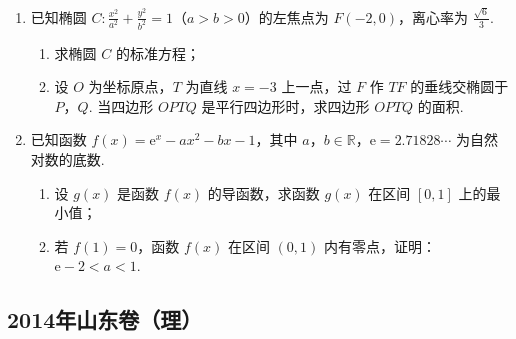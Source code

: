 \begin{description}
\begin{enumerate}[leftmargin=5pt]
\begin{enumerate}
\item 证明：数列 \(\{b_{n}\}\) 为等比数列；
\item 若 \(a_{1} = 1\)，函数 \(f(x)\) 的图象在点 \((a_{2}, b_{2})\) 处的切线在 \(x\) 轴上的截距为 \(2 - \frac{1}{\ln 2}\)，求数列 \(\{a_{n} b_{n}^{2}\}\) 的前 \(n\) 项和 \(S_{n}\).
\end{enumerate}

        \item 已知椭圆 \(C: \frac{x^2}{a^2} + \frac{y^2}{b^2} = 1\)（\(a > b > 0\)）的左焦点为 \(F(-2,0)\)，离心率为 \(\frac{\sqrt{6}}{3}\).

\begin{enumerate}
\item 求椭圆 \(C\) 的标准方程；
\item 设 \(O\) 为坐标原点，\(T\) 为直线 \(x = -3\) 上一点，过 \(F\) 作 \(TF\) 的垂线交椭圆于 \(P\)，\(Q\). 当四边形 \(OPTQ\) 是平行四边形时，求四边形 \(OPTQ\) 的面积.
\end{enumerate}

        \item 已知函数 \(f(x) = {\mathrm{e}}^{x} - ax^{2} - bx - 1\)，其中 \(a\)，\(b \in \mathbb{R}\)，\({\mathrm{e}} = 2.71828\cdots\) 为自然对数的底数.

\begin{enumerate}
\item 设 \(g(x)\) 是函数 \(f(x)\) 的导函数，求函数 \(g(x)\) 在区间 \([0,1]\) 上的最小值；
\item 若 \(f(1)=0\)，函数 \(f(x)\) 在区间 \((0,1)\) 内有零点，证明：\({\mathrm{e}} - 2 < a < 1\).
\end{enumerate}

    \end{enumerate}

\end{description}


\subsection{2014年山东卷（理）}\label{gk:2014年山东卷（理）}

